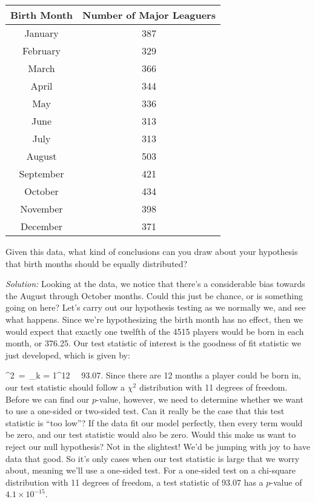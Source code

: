 \begin{center} \label{tab:baseballbirthmonths}
\begin{tabular}{|c|c|}
\hline
Birth Month &Number of Major Leaguers\tabularnewline
\hline
\hline
January & 387\tabularnewline
\hline
February & 329\tabularnewline
\hline
March & 366\tabularnewline
\hline
April & 344\tabularnewline
\hline
May & 336\tabularnewline
\hline
June & 313\tabularnewline
\hline
July & 313\tabularnewline
\hline
August & 503\tabularnewline
\hline
September & 421\tabularnewline
\hline
October & 434\tabularnewline
\hline
November & 398\tabularnewline
\hline
December & 371\tabularnewline
\hline
\end{tabular}
\par\end{center}

Given this data, what kind of conclusions can you draw about your hypothesis that birth months should be equally distributed?

\emph{Solution:}  Looking at the data, we notice that there's a considerable bias towards the August through October months.  Could this just be chance, or is something going on here? Let's carry out our hypothesis testing as we normally we, and see what happens.  Since we're hypothesizing the birth month has no effect, then we would expect that exactly one twelfth of the 4515 players would be born in each month, or 376.25.  Our test statistic of interest is the goodness of fit statistic we just developed, which is given by:

\bel
\chi^2\ =\ \sum_{k = 1}^{12} \ \approx \  93.07.
\eel
Since there are 12 months a player could be born in, our test statistic should follow a $\chi^2$ distribution with 11 degrees of freedom.  Before we can find our $p$-value, however, we need to determine whether we want to use a one-sided or two-sided test.  Can it really be the case that this test statistic is ``too low''?  If the data fit our model perfectly, then every term would be zero, and our test statistic would also be zero.  Would this make us want to reject our null hypothesis?  Not in the slightest!  We'd be jumping with joy to have data that good.  So it's only cases when our test statistic is large that we worry about, meaning we'll use a one-sided test.  For a one-sided test on a chi-square distribution with 11 degrees of freedom, a test statistic of 93.07 has a $p$-value of $4.1 \times 10^{-15}$.




